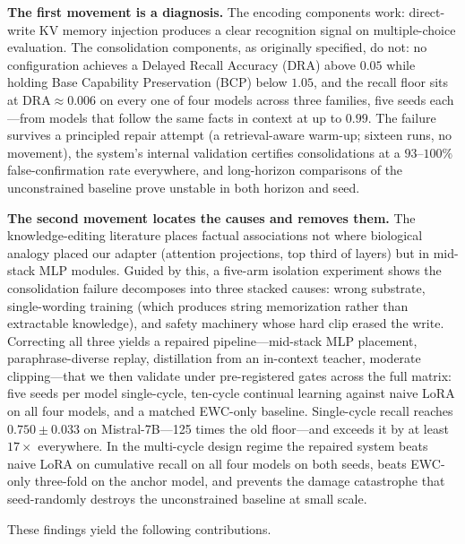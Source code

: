 \textbf{The first movement is a diagnosis.} The encoding components work: direct-write KV memory injection produces a clear recognition signal on multiple-choice evaluation. The consolidation components, as originally specified, do not: no configuration achieves a Delayed Recall Accuracy (DRA) above $0.05$ while holding Base Capability Preservation (BCP) below $1.05$, and the recall floor sits at $\mathrm{DRA} \approx 0.006$ on every one of four models across three families, five seeds each---from models that follow the same facts in context at up to $0.99$. The failure survives a principled repair attempt (a retrieval-aware warm-up; sixteen runs, no movement), the system's internal validation certifies consolidations at a $93$--$100\%$ false-confirmation rate everywhere, and long-horizon comparisons of the unconstrained baseline prove unstable in both horizon and seed.

\textbf{The second movement locates the causes and removes them.} The knowledge-editing literature places factual associations not where biological analogy placed our adapter (attention projections, top third of layers) but in mid-stack MLP modules. Guided by this, a five-arm isolation experiment shows the consolidation failure decomposes into three stacked causes: wrong substrate, single-wording training (which produces string memorization rather than extractable knowledge), and safety machinery whose hard clip erased the write. Correcting all three yields a repaired pipeline---mid-stack MLP placement, paraphrase-diverse replay, distillation from an in-context teacher, moderate clipping---that we then validate under pre-registered gates across the full matrix: five seeds per model single-cycle, ten-cycle continual learning against naive LoRA on all four models, and a matched EWC-only baseline. Single-cycle recall reaches $0.750 \pm 0.033$ on Mistral-7B---125 times the old floor---and exceeds it by at least $17\times$ everywhere. In the multi-cycle design regime the repaired system beats naive LoRA on cumulative recall on all four models on both seeds, beats EWC-only three-fold on the anchor model, and prevents the damage catastrophe that seed-randomly destroys the unconstrained baseline at small scale.

These findings yield the following contributions.

